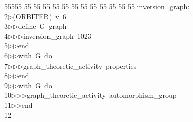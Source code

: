 %
%
\begin{tabbing}
55555 \= 55 \= 55 \= 55 \= 55 \= 55 \= 55 \= 55 \= 55 \= 55 \= 55 \= 55 \= 55 \= \>inversion\_graph:\\[0pt]
2\>$\triangleright$\>(ORBITER)\ v\ 6\ \\[0pt]
3\>$\triangleright$\>$\triangleright$\>define\ G\ graph\ \\[0pt]
4\>$\triangleright$\>$\triangleright$\>$\triangleright$\>inversion\_graph\ 1023\ \\[0pt]
5\>$\triangleright$\>$\triangleright$\>end\ \\[0pt]
6\>$\triangleright$\>$\triangleright$\>with\ G\ do\ \\[0pt]
7\>$\triangleright$\>$\triangleright$\>$\triangleright$\>graph\_theoretic\_activity\ properties\ \\[0pt]
8\>$\triangleright$\>$\triangleright$\>end\ \\[0pt]
9\>$\triangleright$\>$\triangleright$\>with\ G\ do\ \\[0pt]
10\>$\triangleright$\>$\triangleright$\>$\triangleright$\>graph\_theoretic\_activity\ automorphism\_group\ \\[0pt]
11\>$\triangleright$\>$\triangleright$\>end\\[0pt]
12\>\end{tabbing}
